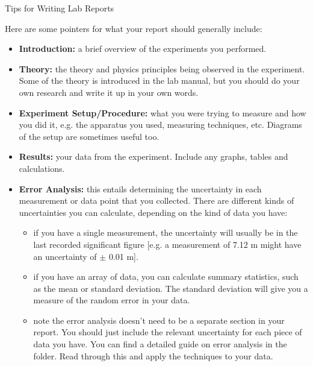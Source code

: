 \documentclass[11pt]{extarticle}
\begin{document}
\setlength{\parindent}{0pt}

\begin{center}
	\huge
	Tips for Writing Lab Reports

	\vspace{0.5cm}
\end{center}

Here are some pointers for what your report should generally include:

\hfill 

\begin{itemize}
	\item {\bf Introduction:} a brief overview of the experiments you performed. 

	\item {\bf Theory:} the theory and physics principles being observed in the experiment. Some of the theory is introduced in the lab manual, but you should do your own research and write it up in your own words. 

	\item {\bf Experiment Setup/Procedure:} what you were trying to measure and how you did it, e.g. the apparatus you used, measuring techniques, etc. Diagrams of the setup are sometimes useful too. 

	\item {\bf Results:} your data from the experiment. Include any graphs, tables and calculations. 

	\item {\bf Error Analysis:} this entails determining the uncertainty in each measurement or data point that you collected. There are different kinds of uncertainties you can calculate, depending on the kind of data you have: 
		\begin{itemize}
			\item if you have a single measurement, the uncertainty will usually be in the last recorded significant figure [e.g. a measurement of 7.12 m might have an uncertainty of $\pm$ 0.01 m]. 
			\item if you have an array of data, you can calculate summary statistics, such as the mean or standard deviation. The standard deviation will give you a measure of the random error in your data.  
			\item note the error analysis doesn't need to be a separate section in your report. You should just include the relevant uncertainty for each piece of data you have. You can find a detailed guide on error analysis in the folder. Read through this and apply the techniques to your data. 
		\end{itemize}


\end{itemize}
\end{document}
